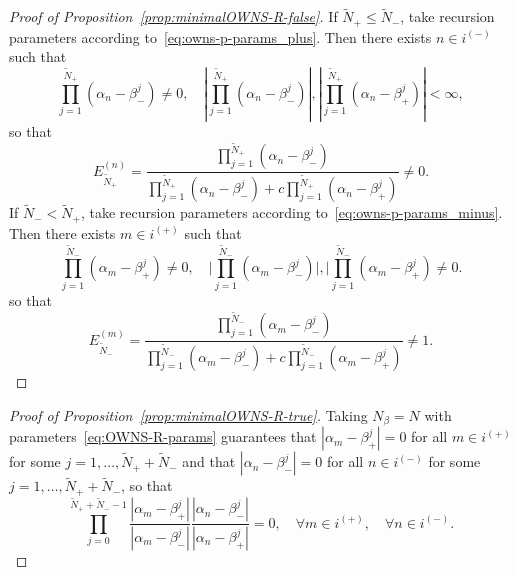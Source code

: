 \begin{proof}[Proof of Proposition~\ref{prop:minimalOWNS-R-false}]
    If $\tilde{N}_+\leq \tilde{N}_-$, take recursion parameters according to~\eqref{eq:owns-p-params_plus}. Then there exists $n\in i^{(-)}$ such that
    \[
    \prod_{j=1}^{\tilde{N}_+}(\alpha_n-\beta_-^j)\neq 0,\quad
    |\prod_{j=1}^{\tilde{N}_+}(\alpha_n-\beta_-^j)|,|\prod_{j=1}^{\tilde{N}_+}(\alpha_n-\beta_+^j)|<\infty,
    \]
    so that
    \[
        E_{\tilde{N}_+}^{(n)}
        =\frac{\prod_{j=1}^{\tilde{N}_+}(\alpha_n-\beta_-^j)}
        {\prod_{j=1}^{\tilde{N}_+}(\alpha_n-\beta_-^j)+ c \prod_{j=1}^{\tilde{N}_+}(\alpha_n-\beta_+^j)}\neq0.
    \]
    If $\tilde{N}_-<\tilde{N}_+$, take recursion parameters according to~\eqref{eq:owns-p-params_minus}. Then there exists $m\in i^{(+)}$ such that
    \[
    \prod_{j=1}^{\tilde{N}_-}(\alpha_m-\beta_+^j)\neq 0,\quad
    |{\prod_{j=1}^{\tilde{N}_-}(\alpha_m-\beta_-^j)|,|\prod_{j=1}^{\tilde{N}_-}(\alpha_m-\beta_+^j)}\neq0.
    \]
    so that
    \[
        E_{\tilde{N}_-}^{(m)}
        =\frac{\prod_{j=1}^{\tilde{N}_-}(\alpha_m-\beta_-^j)}
        {\prod_{j=1}^{\tilde{N}_-}(\alpha_m-\beta_-^j)+c\prod_{j=1}^{\tilde{N}_-}(\alpha_m-\beta_+^j)}\neq1.
    \]
\end{proof}

\begin{proof}[Proof of Proposition~\ref{prop:minimalOWNS-R-true}]
    Taking $N_\beta=N$ with parameters~\eqref{eq:OWNS-R-params} guarantees that $|\alpha_m-\beta_+^j|=0$ for all $m\in i^{(+)}$ for some $j=1,\dots,\tilde{N}_++\tilde{N}_-$ and that $|\alpha_n-\beta_-^j|=0$ for all $n\in i^{(-)}$ for some $j=1,\dots,\tilde{N}_++\tilde{N}_-$, so that
    \[
    \prod_{j=0}^{\tilde{N}_++\tilde{N}_--1}\frac{|\alpha_m-\beta_{+}^{j}|}
    {|\alpha_m-\beta_-^j|}
    \frac{|\alpha_n-\beta_{-}^{j}|}
    {|\alpha_n-\beta_+^j|}=0,\quad \forall m\in i^{(+)},\quad \forall n\in i^{(-)}.
    \]
\end{proof}

